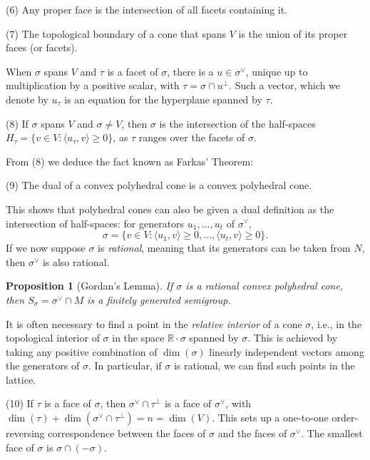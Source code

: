 \documentclass[10pt,a4paper]{book}
\newtheorem{prop}[thm]{Proposition}
\newcommand{\on}{\operatorname}
\begin{document}
\smallskip
\noindent (6) Any proper face is the intersection of all facets containing it.
\smallskip

\smallskip
\noindent (7) The topological boundary of a cone that spans $V$ is the union of its proper faces (or facets).
\medskip

When $\sigma$ spans $V$ and $\tau$ is a facet of $\sigma$, there is a $u\in \sigma^\vee$, unique up to multiplication by a positive scalar, with $\tau= \sigma\cap u^\perp$. Such a vector, which we denote by $u_\tau$ is an equation for the hyperplane spanned by $\tau$.

\medskip
\noindent (8) If $\sigma$ spans $V$ and $\sigma \neq V$, then $\sigma$ is the intersection of the half-spaces $H_\tau = \{v\in V: \langle u_\tau, v \rangle \geq 0\}$, as $\tau$ ranges over the facets of $\sigma$.
\medskip

From (8) we deduce the fact known as Farkas' Theorem:

\medskip 
\noindent (9) The dual of a convex polyhedral cone is a convex polyhedral cone.
\medskip


This shows that polyhedral cones can also be given a dual definition as the intersection of half-spaces: for generators $u_1,...,u_t$ of $\sigma^\vee$,
\[
\sigma = \{v\in V: \langle u_1, v\rangle \geq 0, ..., \langle u_t, v\rangle \geq 0 \}.
\]
If we now suppose $\sigma$ is \textit{rational}, meaning that its generators can be taken from $N$, then $\sigma^\vee$ is also rational.

\begin{prop}[Gordan's Lemma] If $\sigma$ is a rational convex polyhedral cone, then $S_\sigma = \sigma^\vee \cap M$ is a finitely generated semigroup.
\end{prop}

It is often necessary to find a point in the \textit{relative interior} of a cone $\sigma$, i.e., in the topological interior of $\sigma$ in the space $\mathbb{R}\cdot \sigma$ spanned by $\sigma$. This is achieved by taking any positive combination of $\on{dim}(\sigma)$ linearly independent vectors among the generators of $\sigma$. In particular, if $\sigma$ is rational, we can find such points in the lattice.

\medskip
\noindent (10) If $\tau$ is a face of $\sigma$, then $\sigma^\vee \cap \tau^\perp$ is a face of $\sigma^\vee$, with $\on{dim}(\tau)+\on{dim}(\sigma^\vee \cap \tau^\perp) = n = \on{dim}(V).$ This sets up a one-to-one order-reversing correspondence between the faces of $\sigma$ and the faces of $\sigma^\vee$. The smallest face of $\sigma$ is $\sigma\cap (-\sigma)$.
\medskip
\end{document}
